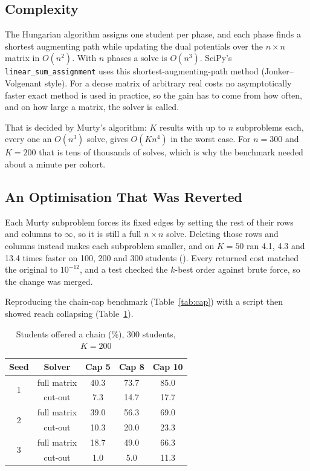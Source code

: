 \subsection{Complexity}

The Hungarian algorithm assigns one student per phase, and each phase
finds a shortest augmenting path while updating the dual potentials
over the $n \times n$ matrix in $O(n^2)$. With $n$ phases a solve is
$O(n^3)$. SciPy's \texttt{linear\_sum\_assignment} uses this
shortest-augmenting-path method (Jonker--Volgenant style). For a dense
matrix of arbitrary real costs no asymptotically faster exact method is
used in practice, so the gain has to come from how often, and on how
large a matrix, the solver is called.

That is decided by Murty's algorithm: $K$ results with up to $n$
subproblems each, every one an $O(n^3)$ solve, gives $O(Kn^4)$ in the
worst case. For $n = 300$ and $K = 200$ that is tens of thousands of
solves, which is why the benchmark needed about a minute per cohort.

\subsection{An Optimisation That Was Reverted}
\label{sec:tie-breaking}

Each Murty subproblem forces its fixed edges by setting the rest of
their rows and columns to $\infty$, so it is still a full $n \times n$
solve. Deleting those rows and columns instead makes each subproblem
smaller, and on $K = 50$ ran 4.1, 4.3 and 13.4 times faster on 100, 200
and 300 students (). Every returned cost matched the
original to $10^{-12}$, and a test checked the $k$-best order against
brute force, so the change was merged.

Reproducing the chain-cap benchmark (Table~\ref{tab:cap}) with a script
then showed reach collapsing (Table~\ref{tab:tie}).

\begin{table}[H]
\centering
\begin{tabular}{ccccc}
\toprule
\textbf{Seed} & \textbf{Solver} & \textbf{Cap 5} & \textbf{Cap 8} & \textbf{Cap 10} \\
\midrule
\multirow{2}{*}{1} & full matrix & 40.3 & 73.7 & 85.0 \\
                   & cut-out     & 7.3  & 14.7 & 17.7 \\
\multirow{2}{*}{2} & full matrix & 39.0 & 56.3 & 69.0 \\
                   & cut-out     & 10.3 & 20.0 & 23.3 \\
\multirow{2}{*}{3} & full matrix & 18.7 & 49.0 & 66.3 \\
                   & cut-out     & 1.0  & 5.0  & 11.3 \\
\bottomrule
\end{tabular}
\caption{Students offered a chain (\%), 300 students, $K = 200$}
\label{tab:tie}
\end{table}

